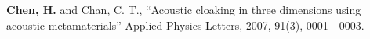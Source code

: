 \begin{publications}{99}

  \item \textbf{Chen, H.} and Chan, C. T., ``Acoustic cloaking in three dimensions using acoustic metamaterials''
    Applied Physics Letters, 2007, 91(3), 0001---0003.

\end{publications}
